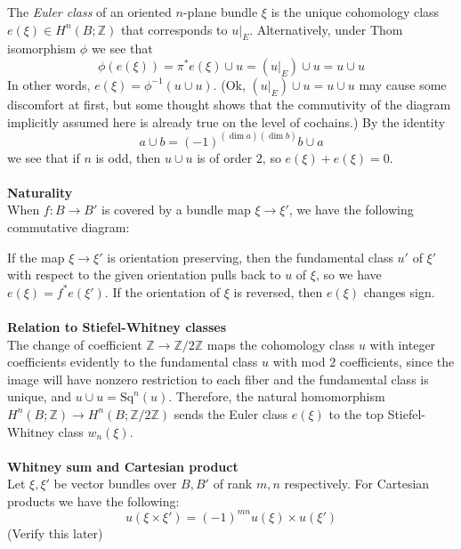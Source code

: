 \documentclass[12pt]{article}
\theoremstyle{plain}
\theoremstyle{definition}
\newcommand{\IZ}{\mathbb{Z}}
\newcommand{\<}{\langle}
\renewcommand{\>}{\rangle}
\newcommand{\Sq}{\mathrm{Sq}}
\begin{document}
The \textit{Euler class} of an oriented $n$-plane bundle $\xi$ is the unique cohomology class $e(\xi) \in H^n(B; \IZ)$ that corresponds to $u|_E$. Alternatively, under Thom isomorphism $\phi$ we see that 
$$ \phi(e(\xi)) = \pi^* e(\xi) \cup u = (u|_E) \cup u = u \cup u$$ 
In other words, $ e(\xi) = \phi^{-1}(u \cup u)$. 
(Ok, $(u|_E) \cup u = u \cup u$ may cause some discomfort at first, but some thought shows that the commutivity of the diagram implicitly assumed here is already true on the level of cochains.)
By the identity 
$$ a \cup b = (-1)^{(\dim a)(\dim b)} b \cup a$$
we see that if $n$ is odd, then $u \cup u$ is of order $2$, so $e(\xi) + e(\xi) = 0$. \\\\
\textbf{Naturality}\\
When $f : B \to B'$ is covered by a bundle map $\xi \to \xi'$, we have the following commutative diagram:
\begin{center}
\end{center}
If the map $\xi \to \xi'$ is orientation preserving, then the fundamental class $u'$ of $\xi'$ with respect to the given orientation  pulls back to $u$ of $\xi$, so we have $e(\xi) = f^* e(\xi')$. If the orientation of $\xi$ is reversed, then $e(\xi)$ changes sign. \\\\
\textbf{Relation to Stiefel-Whitney classes}\\
The change of coefficient $\IZ \to \IZ/2\IZ$ maps the cohomology class $u$ with integer coefficients evidently to the fundamental class $u$ with mod $2$ coefficients, since the image will have nonzero restriction to each fiber and the fundamental class is unique, and $u \cup u = \Sq^n(u)$. Therefore, the natural homomorphism $H^n(B; \IZ) \to H^n(B; \IZ/2\IZ)$ sends the Euler class $e(\xi)$ to the top Stiefel-Whitney class $w_n(\xi)$. \\\\
\textbf{Whitney sum and Cartesian product}\\
Let $\xi, \xi'$ be vector bundles over $B, B'$ of rank $m, n$ respectively. 
For Cartesian products we have the following:
$$ u(\xi \times \xi') = (-1)^{mn} u(\xi) \times u(\xi') $$ (Verify this later)
\end{document}
